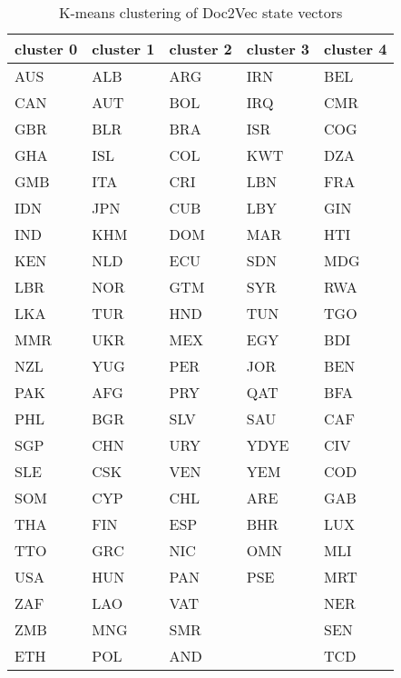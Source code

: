 \begin{table}[ht!]
\centering
\caption{K-means clustering of Doc2Vec state vectors}
\label{tab:doc2vec clustering}
\begin{tabular}{lllll}
\toprule
cluster 0 & cluster 1 & cluster 2 & cluster 3 & cluster 4 \\
\midrule
      AUS &       ALB &       ARG &       IRN &       BEL \\
      CAN &       AUT &       BOL &       IRQ &       CMR \\
      GBR &       BLR &       BRA &       ISR &       COG \\
      GHA &       ISL &       COL &       KWT &       DZA \\
      GMB &       ITA &       CRI &       LBN &       FRA \\
      IDN &       JPN &       CUB &       LBY &       GIN \\
      IND &       KHM &       DOM &       MAR &       HTI \\
      KEN &       NLD &       ECU &       SDN &       MDG \\
      LBR &       NOR &       GTM &       SYR &       RWA \\
      LKA &       TUR &       HND &       TUN &       TGO \\
      MMR &       UKR &       MEX &       EGY &       BDI \\
      NZL &       YUG &       PER &       JOR &       BEN \\
      PAK &       AFG &       PRY &       QAT &       BFA \\
      PHL &       BGR &       SLV &       SAU &       CAF \\
      SGP &       CHN &       URY &      YDYE &       CIV \\
      SLE &       CSK &       VEN &       YEM &       COD \\
      SOM &       CYP &       CHL &       ARE &       GAB \\
      THA &       FIN &       ESP &       BHR &       LUX \\
      TTO &       GRC &       NIC &       OMN &       MLI \\
      USA &       HUN &       PAN &       PSE &       MRT \\
      ZAF &       LAO &       VAT &           &       NER \\
      ZMB &       MNG &       SMR &           &       SEN \\
      ETH &       POL &       AND &           &       TCD \\

\end{tabular}
\end{table}
